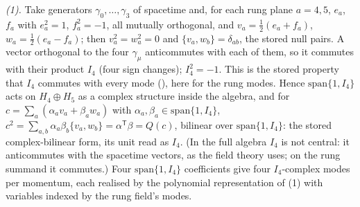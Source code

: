 \emph{(1).} Take generators $\gamma_{0}, \ldots, \gamma_{3}$ of spacetime and, for each rung plane $a = 4, 5$, $e_{a}$, $f_{a}$ with $e_{a}^{2} = 1$, $f_{a}^{2} = -1$, all mutually orthogonal, and $v_{a} = \tfrac12(e_{a} + f_{a})$, $w_{a} = \tfrac12(e_{a} - f_{a})$; then $v_{a}^{2} = w_{a}^{2} = 0$ and $\{v_{a}, w_{b}\} = \delta_{ab}$, the stored null pairs. A vector orthogonal to the four $\gamma_{\mu}$ anticommutes with each of them, so it commutes with their product $I_{4}$ (four sign changes); $I_{4}^{2} = -1$. This is the stored property that $I_{4}$ commutes with every mode (), here for the rung modes. Hence $\mathrm{span}\{1, I_{4}\}$ acts on $H_{4} \oplus H_{5}$ as a complex structure inside the algebra, and for $c = \sum_{a}(\alpha_{a}v_{a} + \beta_{a}w_{a})$ with $\alpha_{a}, \beta_{a} \in \mathrm{span}\{1, I_{4}\}$, $c^{2} = \sum_{a,b}\alpha_{a}\beta_{b}\{v_{a}, w_{b}\} = \alpha^{\mathsf T}\beta = Q(c)$, bilinear over $\mathrm{span}\{1, I_{4}\}$: the stored complex-bilinear form, its unit read as $I_{4}$. (In the full algebra $I_{4}$ is not central: it anticommutes with the spacetime vectors, as the field theory uses; on the rung summand it commutes.) Four $\mathrm{span}\{1, I_{4}\}$ coefficients give four $I_{4}$-complex modes per momentum, each realised by the polynomial representation of (1) with variables indexed by the rung field's modes.

